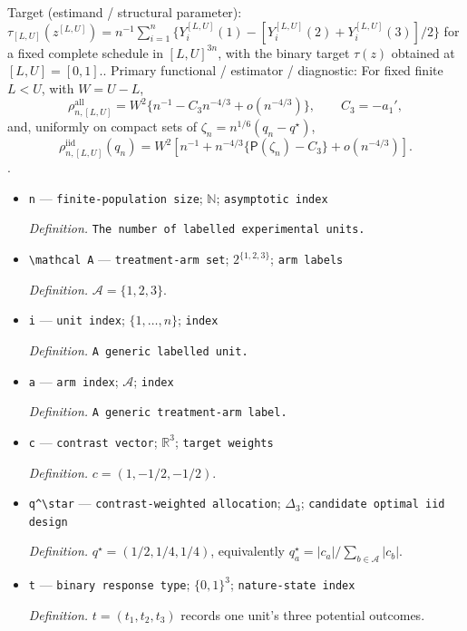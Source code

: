 \documentclass{article}
\begin{document}
Target (estimand / structural parameter): \(\tau_{[L,U]}(z^{[L,U]})=n^{-1}\sum_{i=1}^n\{Y_i^{[L,U]}(1)-[Y_i^{[L,U]}(2)+Y_i^{[L,U]}(3)]/2\}\) for a fixed complete schedule in \([L,U]^{3n}\), with the binary target \(\tau(z)\) obtained at \([L,U]=[0,1]\)..
Primary functional / estimator / diagnostic: For fixed finite \(L<U\), with \(W=U-L\),
\[
\rho_{n,[L,U]}^{\mathrm{all}}
=W^2\{n^{-1}-C_3n^{-4/3}+o(n^{-4/3})\},
\qquad C_3=-a_1',
\]
and, uniformly on compact sets of \(\zeta_n=n^{1/6}(q_n-q^\star)\),
\[
\rho_{n,[L,U]}^{\mathrm{iid}}(q_n)
=W^2\left[n^{-1}+n^{-4/3}\{\mathsf P(\zeta_n)-C_3\}
+o(n^{-4/3})\right].
\].
\begin{itemize}
  \item \texttt{n} --- \texttt{finite-\allowbreak{}population size}; \(\mathbb N\); \texttt{asymptotic index}
  \par\smallskip\noindent\emph{Definition.} \texttt{The number of labelled experimental units.}
  \item \texttt{\textbackslash{}\allowbreak{}mathcal A} --- \texttt{treatment-\allowbreak{}arm set}; \(2^{\{1,2,3\}}\); \texttt{arm labels}
  \par\smallskip\noindent\emph{Definition.} \(\mathcal A=\{1,2,3\}\).
  \item \texttt{i} --- \texttt{unit index}; \(\{1,\ldots,n\}\); \texttt{index}
  \par\smallskip\noindent\emph{Definition.} \texttt{A generic labelled unit.}
  \item \texttt{a} --- \texttt{arm index}; \(\mathcal A\); \texttt{index}
  \par\smallskip\noindent\emph{Definition.} \texttt{A generic treatment-\allowbreak{}arm label.}
  \item \texttt{c} --- \texttt{contrast vector}; \(\mathbb R^3\); \texttt{target weights}
  \par\smallskip\noindent\emph{Definition.} \(c=(1,-1/2,-1/2)\).
  \item \texttt{q\textasciicircum{}\textbackslash{}\allowbreak{}star} --- \texttt{contrast-\allowbreak{}weighted allocation}; \(\Delta_3\); \texttt{candidate optimal iid design}
  \par\smallskip\noindent\emph{Definition.} \(q^\star=(1/2,1/4,1/4)\), equivalently \(q_a^\star=|c_a|/\sum_{b\in\mathcal A}|c_b|\).
  \item \texttt{t} --- \texttt{binary response type}; \(\{0,1\}^3\); \texttt{nature-\allowbreak{}state index}
  \par\smallskip\noindent\emph{Definition.} \(t=(t_1,t_2,t_3)\) records one unit's three potential outcomes.

\end{itemize}
\end{document}
